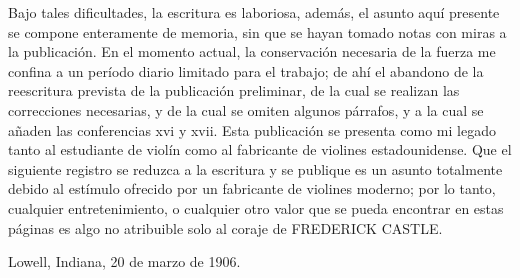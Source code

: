 Bajo tales dificultades, la escritura es laboriosa, además, el asunto aquí presente se compone enteramente de memoria, sin que se hayan tomado notas con miras a la publicación. En el momento actual, la conservación necesaria de la fuerza me confina a un período diario limitado para el trabajo; de ahí el abandono de la reescritura prevista de la publicación preliminar, de la cual se realizan las correcciones necesarias, y de la cual se omiten algunos párrafos, y a la cual se añaden las conferencias xvi y xvii. Esta publicación se presenta como mi legado tanto al estudiante de violín como al fabricante de violines estadounidense. Que el siguiente registro se reduzca a la escritura y se publique es un asunto totalmente debido al estímulo ofrecido por un fabricante de violines moderno; por lo tanto, cualquier entretenimiento, o cualquier otro valor que se pueda encontrar en estas páginas es algo no atribuible solo al coraje de FREDERICK CASTLE.

Lowell, Indiana, 20 de marzo de 1906.
